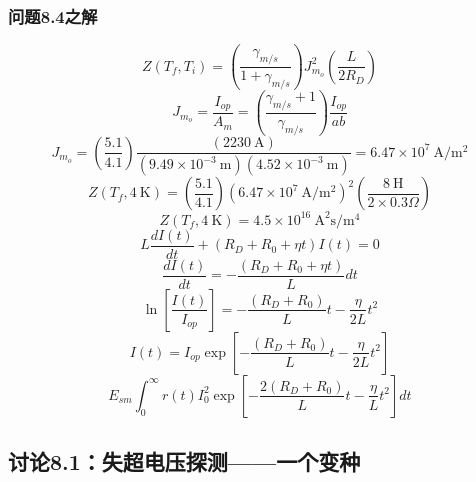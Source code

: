 \subsubsection{问题8.4之解}

\begin{equation}%
Z(T_f,T_i)=\left(\frac{\gamma_{m/s}}{1+\gamma_{m/s}}\right)J_{m_o}^{2}\left(\frac{L}{2R_D}\right)
\end{equation}
\begin{equation}%
J_{m_o}=\frac{I_{op}}{A_m}=\left(\frac{\gamma_{m/s}+1}{\gamma_{m/s}}\right)\frac{I_{op}}{ab}
\end{equation}
\begin{equation}%
J_{m_o}=\left(\frac{5.1}{4.1}\right)\frac{(2230\ \mathrm{A})}{(9.49\times 10^{-3}\ \mathrm{m})(4.52\times 10^{-3}\ \mathrm{m})} 
=6.47\times 10^7\ \mathrm{A/m^2}
\end{equation}
\begin{equation}%
Z(T_f,4\ \mathrm{K})=\left(\frac{5.1}{4.1}\right)(6.47\times 10^7\ \mathrm{A/m^2})^2\left(\frac{8\ \mathrm{H}}{2\times 0.3\Omega}\right)
\end{equation}
\begin{equation}%
Z(T_f,4\ \mathrm{K})=4.5\times 10^{16}\ \mathrm{A^2s/m^4}
\end{equation}
\begin{equation}%
L\frac{dI(t)}{dt}+(R_D+R_0+\eta t)I(t)=0
\end{equation}
\begin{equation}%
\frac{dI(t)}{dt}=-\frac{(R_D+R_0+\eta t)}{L}dt
\end{equation}
\begin{equation}%
\ln\left[\frac{I(t)}{I_{op}}\right]=-\frac{(R_D+R_0)}{L}t-\frac{\eta}{2L}t^2
\end{equation}
\begin{equation}%
I(t)=I_{op}\exp\left[-\frac{(R_D+R_0)}{L}t-\frac{\eta}{2L}t^2\right]
\end{equation}
\begin{equation}%
E_{sm}\int_{0}^{\infty}r(t)I_{0}^{2}\exp\left[-\frac{2(R_D+R_0)}{L}t-\frac{\eta}{L}t^2\right]dt
\end{equation}

\subsection{讨论8.1：失超电压探测——一个变种}


